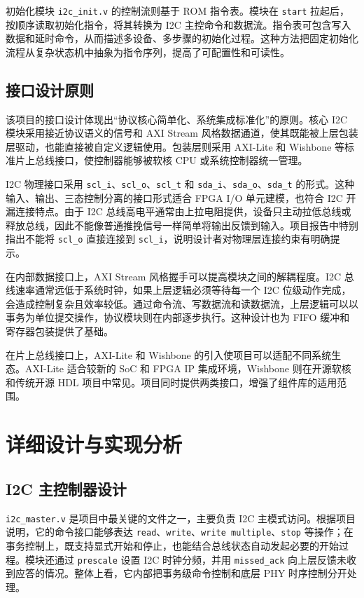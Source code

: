 \documentclass[12pt,a4paper]{article}
\numberwithin{equation}{section}
\begin{document}
初始化模块 \texttt{i2c\_init.v} 的控制流则基于 ROM 指令表。模块在 \texttt{start} 拉起后，按顺序读取初始化指令，将其转换为 I2C 主控命令和数据流。指令表可包含写入数据和延时命令，从而描述多设备、多步骤的初始化过程。这种方法把固定初始化流程从复杂状态机中抽象为指令序列，提高了可配置性和可读性。

\subsection{接口设计原则}

该项目的接口设计体现出“协议核心简单化、系统集成标准化”的原则。核心 I2C 模块采用接近协议语义的信号和 AXI Stream 风格数据通道，使其既能被上层包装层驱动，也能直接被自定义逻辑使用。包装层则采用 AXI-Lite 和 Wishbone 等标准片上总线接口，使控制器能够被软核 CPU 或系统控制器统一管理。

I2C 物理接口采用 \texttt{scl\_i}、\texttt{scl\_o}、\texttt{scl\_t} 和 \texttt{sda\_i}、\texttt{sda\_o}、\texttt{sda\_t} 的形式。这种输入、输出、三态控制分离的接口形式适合 FPGA I/O 单元建模，也符合 I2C 开漏连接特点。由于 I2C 总线高电平通常由上拉电阻提供，设备只主动拉低总线或释放总线，因此不能像普通推挽信号一样简单将输出反馈到输入。项目报告中特别指出不能将 \texttt{scl\_o} 直接连接到 \texttt{scl\_i}，说明设计者对物理层连接约束有明确提示。

在内部数据接口上，AXI Stream 风格握手可以提高模块之间的解耦程度。I2C 总线速率通常远低于系统时钟，如果上层逻辑必须等待每一个 I2C 位级动作完成，会造成控制复杂且效率较低。通过命令流、写数据流和读数据流，上层逻辑可以以事务为单位提交操作，协议模块则在内部逐步执行。这种设计也为 FIFO 缓冲和寄存器包装提供了基础。

在片上总线接口上，AXI-Lite 和 Wishbone 的引入使项目可以适配不同系统生态。AXI-Lite 适合较新的 SoC 和 FPGA IP 集成环境，Wishbone 则在开源软核和传统开源 HDL 项目中常见。项目同时提供两类接口，增强了组件库的适用范围。

\clearpage
\section{详细设计与实现分析}

\subsection{I2C 主控制器设计}

\texttt{i2c\_master.v} 是项目中最关键的文件之一，主要负责 I2C 主模式访问。根据项目说明，它的命令接口能够表达 \texttt{read}、\texttt{write}、\texttt{write multiple}、\texttt{stop} 等操作；在事务控制上，既支持显式开始和停止，也能结合总线状态自动发起必要的开始过程。模块还通过 \texttt{prescale} 设置 I2C 时钟分频，并用 \texttt{missed\_ack} 向上层反馈未收到应答的情况。整体上看，它内部把事务级命令控制和底层 PHY 时序控制分开处理。
\end{document}
